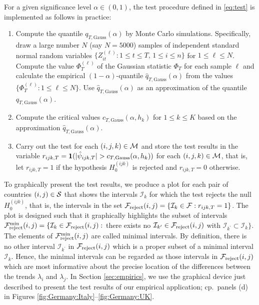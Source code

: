 \documentclass[a4paper,12pt]{article}
\numberwithin{equation}{section}
\begin{document}
For a given significance level $\alpha \in (0,1)$, the test procedure defined in \eqref{eq:test} is implemented as follows in practice: 
\begin{enumerate}[label=\textit{Step \arabic*.}, leftmargin=1.45cm]
\item Compute the quantile $q_{T,\text{Gauss}}(\alpha)$ by Monte Carlo simulations. Specifically, draw a large number $N$ (say $N=5000$) samples of independent standard normal random variables $\{Z_{it}^{(\ell)} : 1 \le t \le T, \, 1 \le i \le n \}$ for $1 \le \ell \le N$. Compute the value $\Phi_T^{(\ell)}$ of the Gaussian statistic $\Phi_T$ for each sample $\ell$ and calculate the empirical $(1-\alpha)$-quantile $\hat{q}_{T,\text{Gauss}}(\alpha)$ from the values $\{ \Phi_T^{(\ell)}: 1 \le \ell \le N \}$. Use $\hat{q}_{T,\text{Gauss}}(\alpha)$ as an approximation of the quantile $q_{T,\text{Gauss}}(\alpha)$. 
\item Compute the critical values $c_{T,\text{Gauss}}(\alpha,h_k)$ for $1 \le k \le K$ based on the approximation $\hat{q}_{T,\text{Gauss}}(\alpha)$.
\item Carry out the test for each $(i,j,k) \in \mathcal{M}$ and store the test results in the variable $r_{ijk,T} = \boldsymbol{1}( |\hat{\psi}_{ijk,T}| > c_{T,\text{Gauss}}(\alpha,h_k))$ for each $(i,j,k) \in \mathcal{M}$, that is, let $r_{ijk,T} = 1$ if the hypothesis $H_0^{(ijk)}$ is rejected and $r_{ijk,T} = 0$ otherwise. 
\end{enumerate}


To graphically present the test results, we produce a plot for each pair of countries $(i,j) \in \mathcal{S}$ that shows the intervals $\mathcal{I}_k$ for which the test rejects the null $H_0^{(ijk)}$, that is, the intervals in the set $\mathcal{F}_{\text{reject}}(i,j) = \{ \mathcal{I}_k \in \mathcal{F}: r_{ijk,T} = 1 \}$. The plot is designed such that it graphically highlights the subset of intervals $\mathcal{F}_{\text{reject}}^{\text{min}}(i,j) = \{ \mathcal{I}_k \in \mathcal{F}_{\text{reject}}(i,j):$ there exists no $\mathcal{I}_{k^\prime} \in \mathcal{F}_{\text{reject}}(i,j)$ with $\mathcal{I}_{k^\prime} \subset \mathcal{I}_k \}$. The elements of $\mathcal{F}_{\text{reject}}^{\text{min}}(i,j)$ are called minimal intervals. By definition, there is no other interval $\mathcal{I}_{k^\prime}$ in $\mathcal{F}_{\text{reject}}(i,j)$ which is a proper subset of a minimal interval $\mathcal{I}_k$. Hence, the minimal intervals can be regarded as those intervals in $\mathcal{F}_{\text{reject}}(i,j)$ which are most informative about the precise location of the differences between the trends $\lambda_i$ and $\lambda_j$. In Section \ref{sec:empirics}, we use the graphical device just described to present the test results of our empirical application; cp.\ panels (d) in Figures \ref{fig:Germany:Italy}--\ref{fig:Germany:UK}.  
\end{document}
